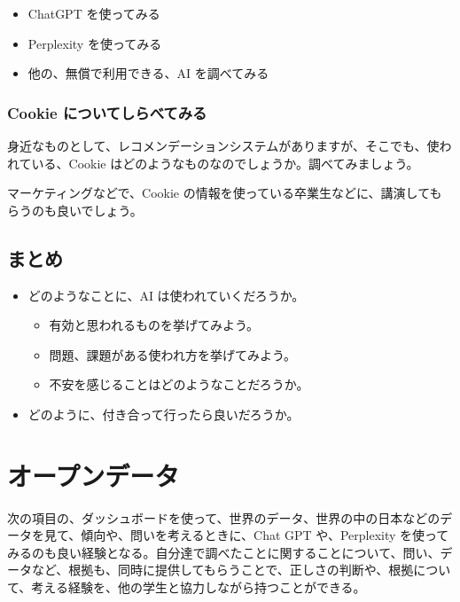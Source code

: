 \documentclass[
]{bxjsbook}
\providecommand{\tightlist}{%
  \setlength{\itemsep}{0pt}\setlength{\parskip}{0pt}}
\theoremstyle{definition}
\theoremstyle{definition}
\theoremstyle{definition}
\theoremstyle{definition}
\theoremstyle{remark}
\begin{document}
\begin{itemize}
\tightlist
\item
  ChatGPT を使ってみる
\item
  Perplexity を使ってみる
\item
  他の、無償で利用できる、AI を調べてみる
\end{itemize}

\hypertarget{cookie-ux306bux3064ux3044ux3066ux3057ux3089ux3079ux3066ux307fux308b}{%
\subsubsection{Cookie についてしらべてみる}\label{cookie-ux306bux3064ux3044ux3066ux3057ux3089ux3079ux3066ux307fux308b}}

身近なものとして、レコメンデーションシステムがありますが、そこでも、使われている、Cookie はどのようなものなのでしょうか。調べてみましょう。

マーケティングなどで、Cookie の情報を使っている卒業生などに、講演してもらうのも良いでしょう。

\hypertarget{ux307eux3068ux3081}{%
\subsection{まとめ}\label{ux307eux3068ux3081}}

\begin{itemize}
\tightlist
\item
  どのようなことに、AI は使われていくだろうか。

  \begin{itemize}
  \tightlist
  \item
    有効と思われるものを挙げてみよう。
  \item
    問題、課題がある使われ方を挙げてみよう。
  \item
    不安を感じることはどのようなことだろうか。
  \end{itemize}
\item
  どのように、付き合って行ったら良いだろうか。
\end{itemize}

\hypertarget{opendata}{%
\section{オープンデータ　}\label{opendata}}

次の項目の、ダッシュボードを使って、世界のデータ、世界の中の日本などのデータを見て、傾向や、問いを考えるときに、Chat GPT や、Perplexity を使ってみるのも良い経験となる。自分達で調べたことに関することについて、問い、データなど、根拠も、同時に提供してもらうことで、正しさの判断や、根拠について、考える経験を、他の学生と協力しながら持つことができる。
\end{document}
